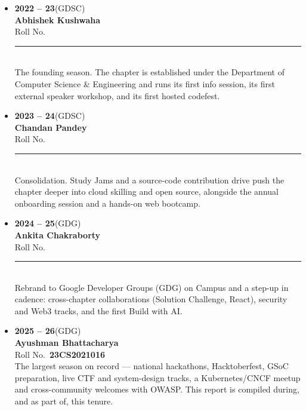 \documentclass[11pt,a4paper]{article}
\begin{document}
\begin{itemize}[leftmargin=1.8em,itemsep=22pt,parsep=0pt,label=\textcolor{GBlue}{\faCircle}]
\item[\textcolor{GBlue}{\faCircle}] {\large\textbf{2022 – 23}}\;\textcolor{Slate}{\small(GDSC)}\\[3pt]\textbf{Abhishek Kushwaha} \\[3pt]{\small\color{Slate}Roll No.~}\rule[-2pt]{3.4cm}{0.4pt}\\[5pt]{\small\color{Slate}The founding season. The chapter is established under the Department of Computer Science \& Engineering and runs its first info session, its first external speaker workshop, and its first hosted codefest.}
\item[\textcolor{GRed}{\faCircle}] {\large\textbf{2023 – 24}}\;\textcolor{Slate}{\small(GDSC)}\\[3pt]\textbf{Chandan Pandey} \\[3pt]{\small\color{Slate}Roll No.~}\rule[-2pt]{3.4cm}{0.4pt}\\[5pt]{\small\color{Slate}Consolidation. Study Jams and a source-code contribution drive push the chapter deeper into cloud skilling and open source, alongside the annual onboarding session and a hands-on web bootcamp.}
\item[\textcolor{GYel}{\faCircle}] {\large\textbf{2024 – 25}}\;\textcolor{Slate}{\small(GDG)}\\[3pt]\textbf{Ankita Chakraborty} \\[3pt]{\small\color{Slate}Roll No.~}\rule[-2pt]{3.4cm}{0.4pt}\\[5pt]{\small\color{Slate}Rebrand to Google Developer Groups (GDG) on Campus and a step-up in cadence: cross-chapter collaborations (Solution Challenge, React), security and Web3 tracks, and the first Build with AI.}
\item[\textcolor{GGrn}{\faCircle}] {\large\textbf{2025 – 26}}\;\textcolor{Slate}{\small(GDG)}\\[3pt]\textbf{Ayushman Bhattacharya} \\[3pt]{\small\color{Slate}Roll No.~}\textbf{23CS2021016}\\[5pt]{\small\color{Slate}The largest season on record — national hackathons, Hacktoberfest, GSoC preparation, live CTF and system-design tracks, a Kubernetes/CNCF meetup and cross-community welcomes with OWASP. This report is compiled during, and as part of, this tenure.}
\end{itemize}
\clearpage
\end{document}
